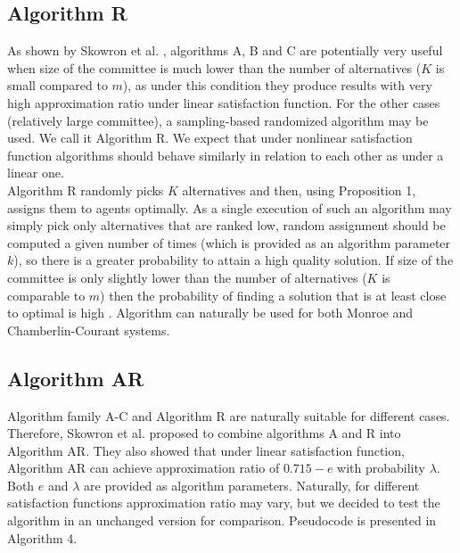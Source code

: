 \subsection{Algorithm R}

As shown by Skowron et al. \cite{1}, algorithms A, B and C are potentially very useful when size of the committee is much lower than the number of alternatives ($K$ is small compared to $m$), as under this condition they produce results with very high approximation ratio under linear satisfaction function. For the other cases (relatively large committee), a sampling-based randomized algorithm may be used. We call it Algorithm R. We expect that under nonlinear satisfaction function algorithms should behave similarly in relation to each other as under a linear one.
\\

Algorithm R randomly picks $K$ alternatives and then, using Proposition 1, assigns them to agents optimally. As a single execution of such an algorithm may simply pick only alternatives that are ranked low, random assignment should be computed a given number of times (which is provided as an algorithm parameter $k$), so there is a greater probability to attain a high quality solution. If size of the committee is only slightly lower than the number of alternatives ($K$ is comparable to $m$) then the probability of finding a solution that is at least close to optimal is high \cite{1}. Algorithm can naturally be used for both Monroe and Chamberlin-Courant systems.

\subsection{Algorithm AR}

Algorithm family A-C and Algorithm R are naturally suitable for different cases. Therefore, Skowron et al. \cite{1} proposed to combine algorithms A and R into Algorithm AR. They also showed that under linear satisfaction function, Algorithm AR can achieve approximation ratio of $0.715 - e$ with probability $\lambda$. Both $e$ and $\lambda$ are provided as algorithm parameters. Naturally, for different satisfaction functions approximation ratio may vary, but we decided to test the algorithm in an unchanged version for comparison. Pseudocode is presented in Algorithm 4.

